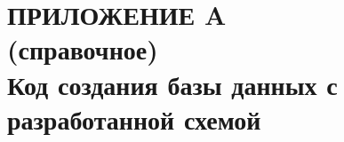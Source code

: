 \renewcommand{\thefigure}{\Asbuk{section}.\arabic{figure}}
\renewcommand{\thetable}{\Asbuk{section}.\arabic{table}}
\renewcommand{\thelstlisting}{\Asbuk{section}.\arabic{lstlisting}}

\section*{ПРИЛОЖЕНИЕ A \\ (справочное) \\ Код создания базы данных с разработанной схемой}
\label{sec:appendix_a}

\setcounter{section}{1}
\setcounter{figure}{0}
\setcounter{table}{0}
\setcounter{lstlisting}{0}






